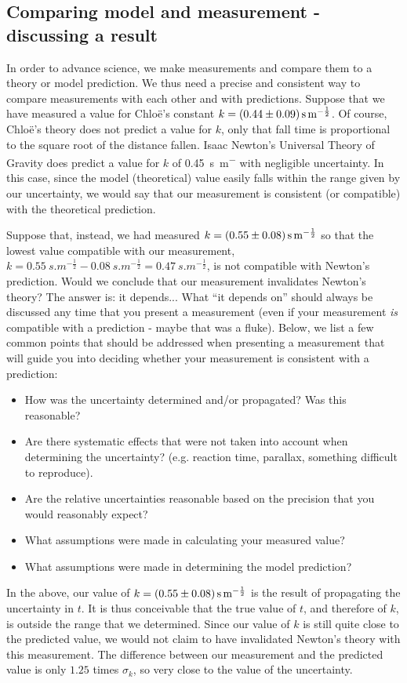 \subsection{Comparing model and measurement - discussing a result}
In order to advance science, we make measurements and compare them to a theory or model prediction. We thus need a precise and consistent way to compare measurements with each other and with predictions. Suppose that we have measured a value for Chlo\"e's constant $k= \SI{0.44 \pm 0.09}{s.m^{-\frac{1}{2}}}$. Of course, Chlo\"e's theory does not predict a value for $k$, only that fall time is proportional to the square root of the distance fallen. Isaac Newton's Universal Theory of Gravity does predict a value for $k$ of \SI{0.45}{s.m^{-}} with negligible uncertainty. In this case, since the model (theoretical) value easily falls within the range given by our uncertainty, we would say that our measurement is consistent (or compatible) with the theoretical prediction. 

Suppose that, instead, we had measured $k=\SI{0.55 \pm 0.08}{s.m^{-\frac{1}{2}}}$ so that the lowest value compatible with our measurement, $k=\SI{0.55}{s.m^{-\frac{1}{2}}}-\SI{0.08}{s.m^{-\frac{1}{2}}}=\SI{0.47}{s.m^{-\frac{1}{2}}}$, is not compatible with Newton's prediction. Would we conclude that our measurement invalidates Newton's theory? The answer is: it depends... What ``it depends on'' should always be discussed any time that you present a measurement (even if your measurement \textit{is} compatible with a prediction - maybe that was a fluke). Below, we list a few common points that should be addressed when presenting a measurement that will guide you into deciding whether your measurement is consistent with a prediction:
\begin{itemize}
\item How was the uncertainty determined and/or propagated? Was this reasonable?
\item Are there systematic effects that were not taken into account when determining the uncertainty? (e.g. reaction time, parallax, something difficult to reproduce).
\item Are the relative uncertainties reasonable based on the precision that you would reasonably expect?
\item What assumptions were made in calculating your measured value?
\item What assumptions were made in determining the model prediction? 
\end{itemize}
In the above, our value of $k= \SI{0.55 \pm 0.08}{s.m^{-\frac{1}{2}}}$ is the result of propagating the uncertainty in $t$. It is thus conceivable that the true value of $t$, and therefore of $k$, is outside the range that we determined. Since our value of $k$ is still quite close to the predicted value, we would not claim to have invalidated Newton's theory with this measurement. The difference between our measurement and the predicted value is only $1.25$ times $\sigma_k$, so very close to the value of the uncertainty. 

